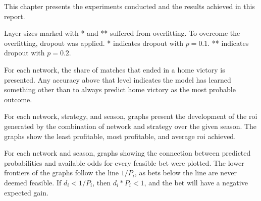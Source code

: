 This chapter presents the experiments conducted and the results achieved in this report.

Layer sizes marked with * and ** suffered from overfitting. To overcome the overfitting, dropout was applied. * indicates dropout with $p = 0.1$. ** indicates dropout with $p = 0.2$.

For each network, the share of matches that ended in a home victory is presented. Any accuracy above that level indicates the model has learned something other than to always predict home victory as the most probable outcome.

For each network, strategy, and season, graphs present the development of the \gls{roi} generated by the combination of network and strategy over the given season. The graphs show the least profitable, most profitable, and average \gls{roi} achieved.

For each network and season, graphs showing the connection between predicted probabilities and available odds for every feasible bet were plotted. The lower frontiers of the graphs follow the line $1/P_{i}$, as bets below the line are never deemed feasible. If $d_{i} < 1 / P_{i}$, then $d_{i} * P_{i} < 1$, and the bet will have a negative expected gain.